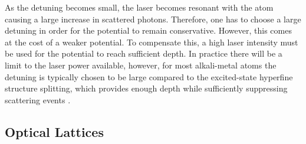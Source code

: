 As the detuning becomes small, the laser becomes resonant with the atom causing a large increase in scattered photons. Therefore, one has to choose a large detuning in order for the potential to remain conservative. However, this comes at the cost of a weaker potential. To compensate this, a high laser intensity must be used for the potential to reach sufficient depth. In practice there will be a limit to the laser power available, however, for most alkali-metal atoms the detuning is typically chosen to be large compared to the excited-state hyperfine structure splitting, which provides enough depth while sufficiently suppressing scattering events \cite{manybodyBloch}. 


\subsection{Optical Lattices}

